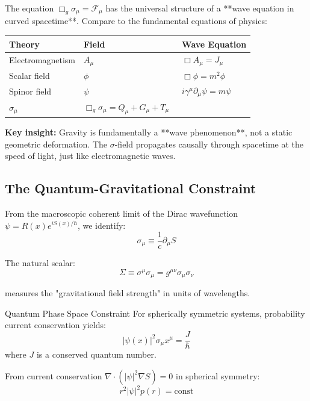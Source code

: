 \documentclass[11pt,a4paper]{article}
\theoremstyle{definition}
\theoremstyle{remark}
\begin{document}
		The equation $\Box_g\sigma_\mu = \mathcal{F}_\mu$ has the universal structure of a **wave equation in curved spacetime**. Compare to the fundamental equations of physics:
		
		\begin{center}
			\begin{tabular}{lll}
				\hline
				\textbf{Theory} & \textbf{Field} & \textbf{Wave Equation}\\
				\hline
				Electromagnetism & $A_\mu$ & $\Box A_\mu = J_\mu$\\
				Scalar field & $\phi$ & $\Box\phi = m^2\phi$\\
				Spinor field & $\psi$ & $i\gamma^\mu\partial_\mu\psi = m\psi$\\
				${\sigma_\mu}$ & ${\Box_g\sigma_\mu = Q_\mu + G_\mu + T_\mu}$\
			\end{tabular}
		\end{center}
		
		\textbf{Key insight:} Gravity is fundamentally a **wave phenomenon**, not a static geometric deformation. The $\sigma$-field propagates causally through spacetime at the speed of light, just like electromagnetic waves.
		
		\subsection{The Quantum-Gravitational Constraint}
		
		From the macroscopic coherent limit of the Dirac wavefunction $\psi = R(x)e^{iS(x)/\hbar}$, we identify:
		\begin{equation}
			\sigma_\mu \equiv \frac{1}{c}\partial_\mu S
		\end{equation}
		
		The natural scalar:
		\begin{equation}
			\Sigma \equiv \sigma^\mu\sigma_\mu = g^{\mu\nu}\sigma_\mu\sigma_\nu
		\end{equation}
		
		measures the "gravitational field strength" in units of wavelengths.
		
		Quantum Phase Space Constraint
			For spherically symmetric systems, probability current conservation yields:
			\begin{equation}\label{eq:quantum_constraint}
				\boxed{|\psi(x)|^2\sigma_\mu x^\mu = \frac{J}{\hbar}}
			\end{equation}
			where $J$ is a conserved quantum number.
		
			From current conservation $\nabla \cdot(|\psi|^2\nabla S) = 0$ in spherical symmetry:
			\begin{equation}
				r^2|\psi|^2 p(r) = \text{const}
			\end{equation}
			
\end{document}

